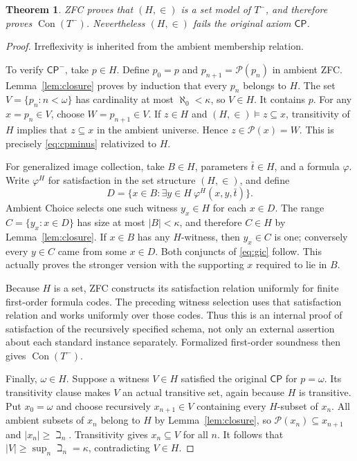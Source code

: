 \documentclass[11pt]{article}
\newtheorem{theorem}{Theorem}
\newcommand{\CP}{\mathsf{CP}}
\newcommand{\Con}{\operatorname{Con}}
\newcommand{\Pow}{\mathcal P}
\begin{document}
\begin{theorem}\label{thm:model}
ZFC proves that $(H,\in)$ is a set model of $T^-$, and therefore proves
$\Con(T^-)$.  Nevertheless $(H,\in)$ fails the original axiom $\CP$.
\end{theorem}
\begin{proof}
Irreflexivity is inherited from the ambient membership relation.

To verify $\CP^-$, take $p\in H$.  Define $p_0=p$ and
$p_{n+1}=\Pow(p_n)$ in ambient ZFC.  Lemma~\ref{lem:closure} proves by
induction that every $p_n$ belongs to $H$.  The set
$V=\{p_n:n<\omega\}$ has cardinality at most $\aleph_0<\kappa$, so
$V\in H$.  It contains $p$.  For any $x=p_n\in V$, choose
$W=p_{n+1}\in V$.  If $z\in H$ and $(H,\in)\models z\subseteq x$,
transitivity of $H$ implies that $z\subseteq x$ in the ambient universe.
Hence $z\in\Pow(x)=W$.  This is precisely \eqref{eq:cpminus} relativized
to $H$.

For generalized image collection, take $B\in H$, parameters $\bar t\in H$,
and a formula $\varphi$.  Write $\varphi^H$ for satisfaction in the set
structure $(H,\in)$, and define
\[
 D=\{x\in B:\exists y\in H\ \varphi^H(x,y,\bar t)\}.
\]
Ambient Choice selects one such witness $y_x\in H$ for each $x\in D$.
The range $C=\{y_x:x\in D\}$ has size at most $|B|<\kappa$, and therefore
$C\in H$ by Lemma~\ref{lem:closure}.  If $x\in B$ has any $H$-witness,
then $y_x\in C$ is one; conversely every $y\in C$ came from some $x\in D$.
Both conjuncts of \eqref{eq:gic} follow.  This actually proves the stronger
version with the supporting $x$ required to lie in $B$.

Because $H$ is a set, ZFC constructs its satisfaction relation uniformly
for finite first-order formula codes.  The preceding witness selection uses
that satisfaction relation and works uniformly over those codes.  Thus this
is an internal proof of satisfaction of the recursively specified schema,
not only an external assertion about each standard instance separately.
Formalized first-order soundness then gives $\Con(T^-)$.

Finally, $\omega\in H$.  Suppose a witness $V\in H$ satisfied the original
$\CP$ for $p=\omega$.  Its transitivity clause makes $V$ an actual
transitive set, again because $H$ is transitive.  Put $x_0=\omega$ and
choose recursively $x_{n+1}\in V$ containing every $H$-subset of $x_n$.
All ambient subsets of $x_n$ belong to $H$ by
Lemma~\ref{lem:closure}, so $\Pow(x_n)\subseteq x_{n+1}$ and
$|x_n|\geq\beth_n$.  Transitivity gives $x_n\subseteq V$ for all $n$.
It follows that $|V|\geq\sup_n\beth_n=\kappa$, contradicting $V\in H$.
\end{proof}
\end{document}
